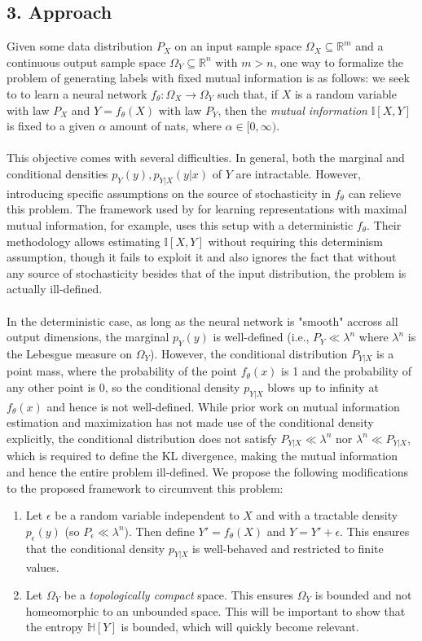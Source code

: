 \documentclass{NSF}
\begin{document}
\subsection{3. Approach}
Given some data distribution $P_X$ on an input sample space $\Omega_X \subseteq \mathbb{R}^m$ and a continuous
output sample space $\Omega_Y \subseteq \mathbb{R}^n$ with $m > n$, one way to formalize the problem of generating labels with fixed mutual information is as follows: we seek to to learn a neural network
$f_\theta: \Omega_X \rightarrow \Omega_Y$ such that, if $X$ is a random variable
with law $P_X$ and $Y=f_\theta(X)$ with law $P_Y$, then the \textit{mutual information}
$\mathbb{I}[X,Y]$ is fixed to a given $\alpha$ amount of nats, where
$\alpha\in [0,\infty)$.
\\
\\
This objective comes with several difficulties.
In general, both the marginal and conditional densities $p_Y(y),p_{Y|X}(y|x)$ of $Y$ are
intractable. However, introducing specific assumptions on the source of stochasticity in
$f_\theta$ can relieve this problem. The framework used by \cite{hjelm2018learning} for
learning representations with maximal mutual information, for
example, uses this setup with a deterministic $f_\theta$. Their methodology allows estimating
$\mathbb{I}[X,Y]$ without requiring this determinism assumption, though it fails to exploit it and also ignores the fact that without any source of stochasticity besides that of the input distribution, the problem is actually ill-defined.
\\
\\
In the deterministic case, as long as the neural network is "smooth" accross all output
dimensions, the marginal $p_Y(y)$ is well-defined (i.e., $P_Y \ll \lambda^n$ where $\lambda^n$ is the Lebesgue measure on $\Omega_Y$). However, the conditional distribution
$P_{Y|X}$ is a point mass, where the probability of the point $f_\theta(x)$ is 1 and the
probability of any other point is 0, so the conditional density $p_{Y|X}$ blows up to
infinity at $f_\theta(x)$ and hence is not well-defined. While prior work on mutual
information estimation and maximization has not made use of the conditional density
explicitly, the conditional distribution does not satisfy $P_{Y|X} \ll \lambda^n$ nor
$\lambda^n \ll P_{Y|X}$, which is required to define the KL divergence, making the mutual information and hence the entire problem ill-defined. We propose the following
modifications to the proposed framework to circumvent this problem:
\begin{enumerate}
\item Let $\epsilon$ be a random variable independent to $X$ and with a tractable
density $p_\epsilon(y)$ (so $P_\epsilon \ll \lambda^n$). Then define $Y' = f_\theta(X)$
and $Y = Y' + \epsilon$. This ensures that the conditional density $p_{Y|X}$ is
well-behaved and restricted to finite values.
\item Let $\Omega_Y$ be a \textit{topologically compact} space. This ensures $\Omega_Y$
is bounded and not homeomorphic to an unbounded space. This will be important to show that the entropy $\mathbb{H}[Y]$ is bounded, which will quickly become relevant.
\end{enumerate}
\end{document}
